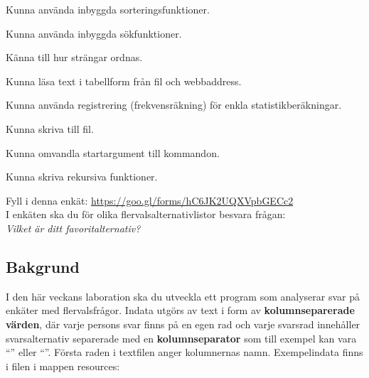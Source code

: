 

\Lab{\LabWeekELEVEN}

\begin{Goals}
\item Kunna använda inbyggda sorteringsfunktioner.
\item Kunna använda inbyggda sökfunktioner.
\item Känna till hur strängar ordnas.
\item Kunna läsa text i tabellform från fil och webbaddress.
\item Kunna använda registrering (frekvensräkning) för enkla statistikberäkningar.
\item Kunna skriva till fil.
\item Kunna omvandla startargument till kommandon.
\item Kunna skriva rekursiva funktioner.
\end{Goals}

\begin{Preparations}
\item {}
\item {}
\item \ReadTheLab
\item Fyll i denna enkät: \url{https://goo.gl/forms/hC6JK2UQXVpbGECc2}  \\
I enkäten ska du för olika flervalsalternativlistor besvara frågan: \\ \textit{Vilket är ditt favoritalternativ?}
\end{Preparations}


\subsection{Bakgrund}

I den här veckans laboration ska du utveckla ett program som analyserar svar på enkäter med flervalsfrågor. Indata utgörs av text i form av \textbf{kolumnseparerade värden}, där varje persons svar finns på en egen rad och varje svarsrad innehåller svarsalternativ separerade med en \textbf{kolumnseparator} som till exempel kan vara ``\code{\t}'' eller ``\code{,}''. Första raden i textfilen anger kolumnernas namn.
Exempelindata finns i filen  i mappen resources:


